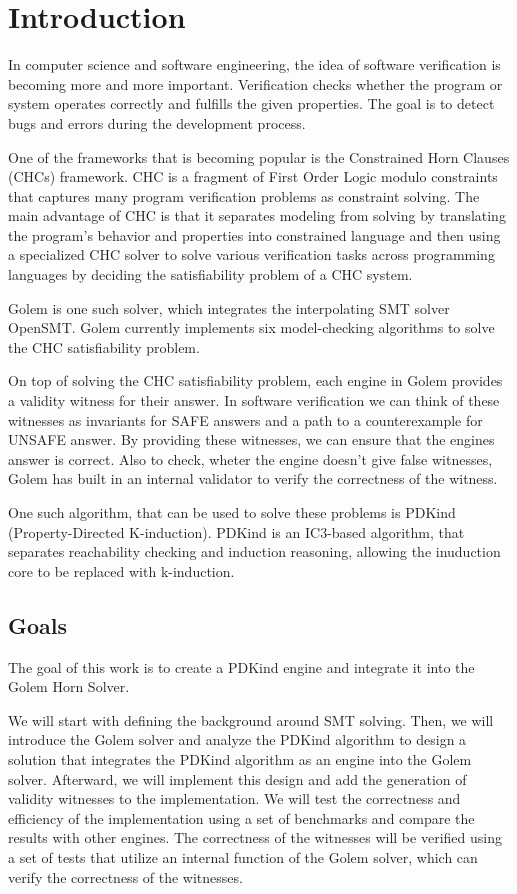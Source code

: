 \chapter{Introduction}

\noindent In computer science and software engineering, the idea of software verification is becoming more and more important. Verification checks whether the program or system operates correctly and fulfills the given properties. The goal is to detect bugs and errors during the development process.

One of the frameworks that is becoming popular is the Constrained Horn Clauses (CHCs)\cite{10.1007/978-3-031-13185-1_2} framework. CHC is a fragment of First Order Logic modulo constraints that captures many program verification problems as constraint solving. The main advantage of CHC is that it separates modeling from solving by translating the program's behavior and properties into constrained language and then using a specialized CHC solver to solve various verification tasks across programming languages by deciding the satisfiability problem of a CHC system.

Golem\cite{blicha_golem_2023} is one such solver, which integrates the interpolating SMT solver OpenSMT\cite{10.1007/978-3-319-40970-2_35}. Golem currently implements six model-checking algorithms to solve the CHC satisfiability problem.

On top of solving the CHC satisfiability problem, each engine in Golem provides a validity witness for their answer. In software verification we can think of these witnesses as invariants for SAFE answers and a path to a counterexample for UNSAFE answer. By providing these witnesses, we can ensure that the engines answer is correct. Also to check, wheter the engine doesn't give false witnesses, Golem has built in an internal validator to verify the correctness of the witness. 

One such algorithm, that can be used to solve these problems is PDKind (Property-Directed K-induction)\cite{7886665}. PDKind is an IC3\cite{6148908}-based algorithm, that separates reachability checking and induction reasoning, allowing the inuduction core to be replaced with k-induction.

\section{Goals}
\noindent The goal of this work is to create a PDKind engine and integrate it into the Golem Horn Solver\cite{blicha_golem_2023}. 

We will start with defining the background around SMT solving. Then, we will introduce the Golem solver and analyze the PDKind algorithm to design a solution that integrates the PDKind algorithm as an engine into the Golem solver. Afterward, we will implement this design and add the generation of validity witnesses to the implementation. We will test the correctness and efficiency of the implementation using a set of benchmarks and compare the results with other engines. The correctness of the witnesses will be verified using a set of tests that utilize an internal function of the Golem solver, which can verify the correctness of the witnesses.

